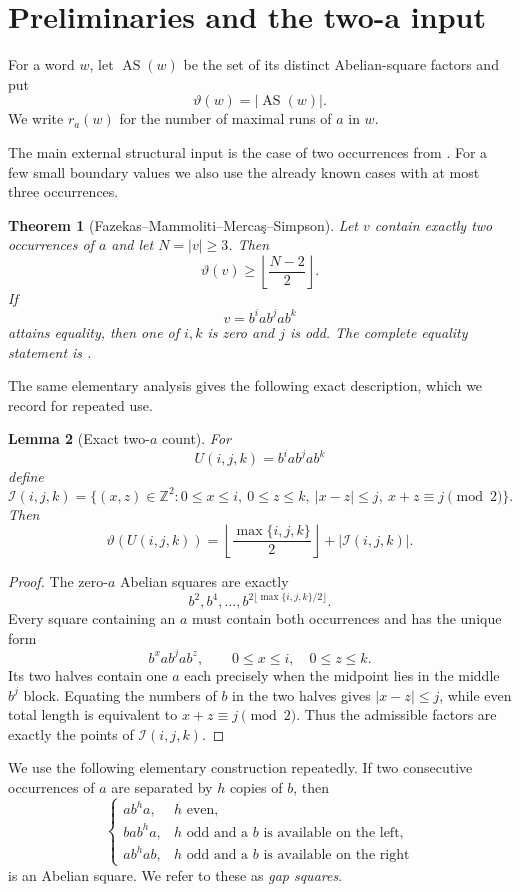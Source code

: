 \documentclass[11pt]{article}
\newtheorem{theorem}{Theorem}[section]
\newtheorem{lemma}[theorem]{Lemma}
\theoremstyle{definition}
\newcommand{\AS}{\operatorname{AS}}
\newcommand{\thetaas}{\vartheta}
\newcommand{\ra}{r_a}
\begin{document}
\section{Preliminaries and the two-a input}

For a word $w$, let $\AS(w)$ be the set of its distinct Abelian-square factors and put
\[
 \thetaas(w)=|\AS(w)|.
\]
We write $\ra(w)$ for the number of maximal runs of $a$ in $w$.

The main external structural input is the case of two occurrences from \cite{FMMS2026}.  For a few small boundary values we also use the already known cases with at most three occurrences.

\begin{theorem}[Fazekas--Mammoliti--Merca\c{s}--Simpson]\label{thm:two-a}
Let $v$ contain exactly two occurrences of $a$ and let $N=|v|\ge3$. Then
\[
 \thetaas(v)\ge \left\lfloor\frac{N-2}{2}\right\rfloor.
\]
If
\[
 v=b^i a b^j a b^k
\]
attains equality, then one of $i,k$ is zero and $j$ is odd. The complete equality statement is \cite[Theorem~7]{FMMS2026}.
\end{theorem}

The same elementary analysis gives the following exact description, which we record for repeated use.

\begin{lemma}[Exact two-$a$ count]\label{lem:two-a-count}
For
\[
 U(i,j,k)=b^i a b^j a b^k
\]
define
\[
 \mathcal I(i,j,k)=
 \bigl\{(x,z)\in\mathbb Z^2:
 0\le x\le i,\ 0\le z\le k,\ |x-z|\le j,\ x+z\equiv j\pmod2\bigr\}.
\]
Then
\[
 \thetaas(U(i,j,k))
 =\left\lfloor\frac{\max\{i,j,k\}}2\right\rfloor+|\mathcal I(i,j,k)|.
\]
\end{lemma}

\begin{proof}
The zero-$a$ Abelian squares are exactly
\[
 b^2,b^4,\ldots,b^{2\lfloor\max\{i,j,k\}/2\rfloor}.
\]
Every square containing an $a$ must contain both occurrences and has the unique form
\[
 b^x a b^j a b^z,\qquad 0\le x\le i,\quad0\le z\le k.
\]
Its two halves contain one $a$ each precisely when the midpoint lies in the middle $b^j$ block. Equating the numbers of $b$ in the two halves gives $|x-z|\le j$, while even total length is equivalent to $x+z\equiv j\pmod2$. Thus the admissible factors are exactly the points of $\mathcal I(i,j,k)$.
\end{proof}

We use the following elementary construction repeatedly. If two consecutive occurrences of $a$ are separated by $h$ copies of $b$, then
\begin{equation}\label{eq:gap-square}
 \begin{cases}
 ab^h a,&h\text{ even},\\
 bab^h a,&h\text{ odd and a }b\text{ is available on the left},\\
 ab^h ab,&h\text{ odd and a }b\text{ is available on the right}
 \end{cases}
\end{equation}
is an Abelian square. We refer to these as \emph{gap squares}.
\end{document}
